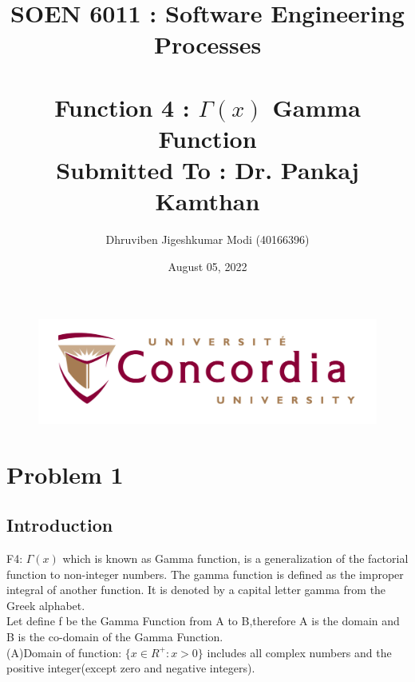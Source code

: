 \documentclass[12pt,a4paper]{report}
\begin{document}
\begin{figure}
    \centering
    \begin{center}
    \includegraphics[width=1.0\linewidth]{Images/Concordia-logo.jpeg}    
    \end{center}
    \label{fig:Concordia University Logo.}
\end{figure}

\title{SOEN 6011 : Software Engineering Processes\\[2.0em] 

 \\
\textbf{Function 4 :  $\Gamma(x)$ Gamma Function} \\[1.5em] Submitted To : Dr. Pankaj Kamthan}

\author{Dhruviben Jigeshkumar Modi (40166396) }
\date{August 05, 2022}


\maketitle

\setcounter{page}{0}

\chapter{Problem 1}

\section{Introduction}

F4: $\Gamma \left( x \right)$ which is known as Gamma function, is a generalization of the factorial function to non-integer numbers. The gamma function is defined as the improper integral of another function. It is denoted by a capital letter gamma from the Greek alphabet. \\

Let define f be the Gamma Function from A to B,therefore A is the domain and B is the  co-domain of the Gamma Function. \\
\indent(A)Domain of function: $\{x \in R^+: x > 0\}$ includes all complex numbers and the positive integer(except zero and negative integers).
\end{document}
